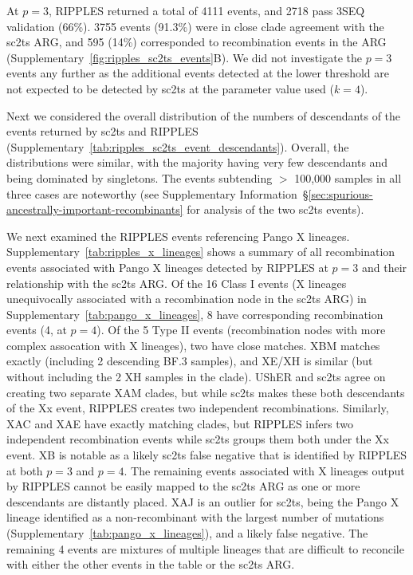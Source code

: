 \documentclass[12pt]{article}
\newcommand{\supref}[1]{Supplementary Information~\S\ref{#1}}
\newcommand{\siref}[1]{Supplementary~\ref{#1}}
\begin{document}
At $p=3$, RIPPLES returned a total of 4111 events, and
2718 pass 3SEQ validation (66\%). 3755 events
(91.3\%) were in close clade agreement with the sc2ts ARG,
and 595 (14\%) corresponded to recombination events in the ARG
(\siref{fig:ripples_sc2ts_events}B).
We did not investigate the $p=3$ events any further as the additional
events detected at the lower threshold are not expected to be detected
by sc2ts at the parameter value used ($k=4$).

Next we considered the overall distribution of the numbers of descendants
of the events returned by sc2ts and RIPPLES
(\siref{tab:ripples_sc2ts_event_descendants}).
Overall, the distributions were similar, with the majority having
very few descendants and being dominated by singletons.
The events subtending $>$ 100,000 samples
in all three cases are noteworthy (see
\supref{sec:spurious-ancestrally-important-recombinants}
for analysis of the two sc2ts events).


We next examined the RIPPLES events referencing Pango X lineages.
\siref{tab:ripples_x_lineages} shows a summary of all
recombination events associated with Pango X lineages detected by RIPPLES
at $p=3$ and their relationship with the sc2ts ARG.
Of the 16 Class I events (X lineages unequivocally associated with
a recombination node in the sc2ts ARG) in \siref{tab:pango_x_lineages},
8 have corresponding recombination events (4, at $p=4$).
Of the 5 Type II events
(recombination nodes with more complex assocation with X lineages),
two have close matches.
XBM matches exactly (including 2 descending BF.3 samples),
and XE/XH is similar (but without including the 2 XH samples in the clade).
UShER and sc2ts agree on creating two separate XAM clades, but while sc2ts
makes these both descendants of the Xx event,
RIPPLES creates two independent recombinations.
Similarly, XAC and XAE have exactly matching clades, but RIPPLES
infers two independent recombination events while sc2ts groups them both
under the Xx event. XB is notable as a likely sc2ts false negative that is
identified by RIPPLES at both $p=3$ and $p=4$. The remaining events
associated with X lineages output by RIPPLES cannot be easily mapped
to the sc2ts ARG as one or more descendants are distantly placed.
XAJ is an outlier for sc2ts, being the Pango X lineage identified as a
non-recombinant with the largest number of mutations
(\siref{tab:pango_x_lineages}), and a likely false negative.
The remaining 4 events are mixtures of multiple lineages that are
difficult to reconcile with either the other events in the table
or the sc2ts ARG.
\end{document}
